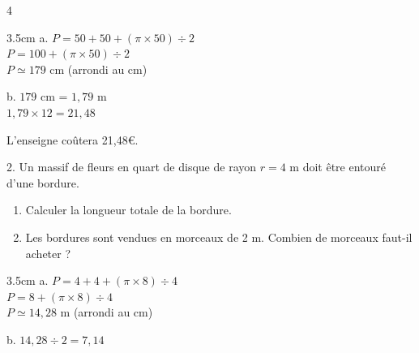 \documentclass[a4paper]{book}
\begin{document}
{\begin{exerciceNote}{4}
\begin{minipage}{0.8\linewidth}
            \begin{ZoneReponse}{3.5cm}
                a. $P=50+50+(\pi\times50)\div2$\\
                $P=100+(\pi\times50)\div2$\\
                $P\simeq179$ cm (arrondi au cm)

                \medskip

                b. $179$ cm = $1,79$ m\\
                $1,79\times12=21,48$

                L'enseigne coûtera 21,48€.
            \end{ZoneReponse}
        \end{minipage}
        \hfill
        \begin{minipage}{0.15\linewidth}
        \end{minipage}

        \medskip

        \begin{minipage}{0.8\linewidth}
            2. Un massif de fleurs en quart de disque de rayon $r = 4$ m doit être entouré d'une bordure.
            \begin{enumerate}[leftmargin=*, label=\alph*.]
                \item Calculer la longueur totale de la bordure.
                \item Les bordures sont vendues en morceaux de 2 m. Combien de morceaux faut-il acheter ?
            \end{enumerate}

            \begin{ZoneReponse}{3.5cm}
                a. $P=4+4+(\pi\times8)\div4$\\
                $P=8+(\pi\times8)\div4$\\
                $P\simeq14,28$ m (arrondi au cm)

                \medskip

                b. $14,28\div2=7,14$ \\
            

\end{ZoneReponse}
\end{minipage}
\end{exerciceNote}}
\end{document}
